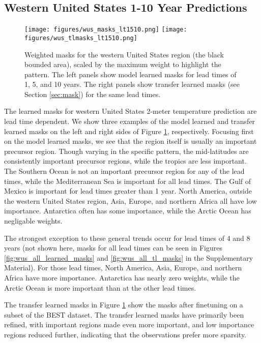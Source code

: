 \subsection{Western United States 1-10 Year Predictions}\label{sec:wus}

\begin{figure}[h!]
    \centering
    \noindent\texttt{[image: figures/wus\_masks\_lt1510.png]}
    \noindent\texttt{[image: figures/wus\_tlmasks\_lt1510.png]}
    \caption{Weighted masks for the western United States region (the black bounded area), scaled by the maximum weight to highlight the pattern.
    The left panels show model learned masks for lead times of 1, 5, and 10 years.
    The right panels show transfer learned masks (see Section \ref{sec:mask}) for the same lead times.
    }
    \label{fig:wus_masks}
\end{figure}

The learned masks for western United States 2-meter temperature prediction are lead time dependent.
We show three examples of the model learned and transfer learned masks on the left and right sides of Figure \ref{fig:wus_masks}, respectively.
Focusing first on the model learned masks, we see that the region itself is usually an important precursor region.
Though varying in the specific pattern, the mid-latitudes are consistently important precursor regions, while the tropics are less important.
The Southern Ocean is not an important precursor region for any of the lead times, while the Mediterranean Sea is important for all lead times.
The Gulf of Mexico is important for lead times greater than 1 year.
North America, outside the western United States region, Asia, Europe, and northern Africa all have low importance.
Antarctica often has some importance, while the Arctic Ocean has negligable weights.

The strongest exception to these general trends occur for lead times of 4 and 8 years (not shown here, masks for all lead times can be seen in Figures \ref{fig:wus_all_learned_masks} and \ref{fig:wus_all_tl_masks} in the Supplementary Material).
For those lead times, North America, Asia, Europe, and northern Africa have more importance.
Antarctica has nearly zero weights, while the Arctic Ocean is more important than at the other lead times.

The transfer learned masks in Figure \ref{fig:wus_masks} show the masks after finetuning on a subset of the BEST dataset.
The transfer learned masks have primarily been refined, with important regions made even more important, and low importance regions reduced further, indicating that the observations prefer more sparsity.

